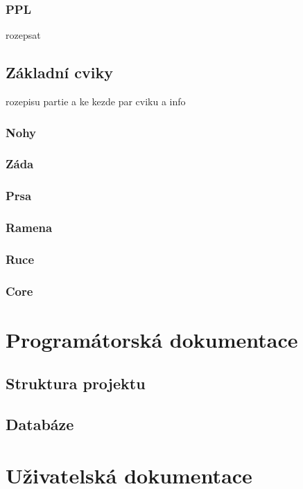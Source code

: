 \documentclass[
  field=inf,
  biblatex,
  glossaries,
  index
]{kidiplom}
\begin{document}
\subsubsection{\gls{PPL}}
rozepsat

\subsection{Základní cviky}
rozepisu partie a ke kezde par cviku a info

\subsubsection{Nohy}
\subsubsection{Záda}
\subsubsection{Prsa}
\subsubsection{Ramena}
\subsubsection{Ruce}
\subsubsection{Core}



\section{Programátorská dokumentace}

\subsection{Struktura projektu}

\subsection{Databáze}

\section{Uživatelská dokumentace}
\end{document}
